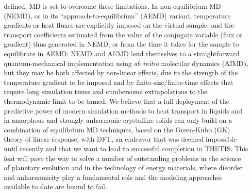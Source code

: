 defined.\cite{Allen1989} MD is set to overcome these limitations. In non-equilibrium MD (NEMD),\cite{Evans1990,Muller-Plathe1997} or in its ``approach-to-equilibrium'' (AEMD) variant,\cite{Lampin2013} temperature gradients or heat fluxes are explicitly imposed on the virtual sample, and the transport coefficients estimated from the value of the conjugate variable (flux or gradient) thus generated in NEMD, or from the time it takes for the sample to equilibrate in AEMD. NEMD and AEMD lend themselves to a straightforward  quantum-mechanical implementation \cite{Stackhouse2010b,Bouzid2017} using \emph{ab initio} molecular dynamics (AIMD),\cite{Car1985,Marx2009} but they may be both affected by non-linear effects, due to the strength of the temperature gradient to be imposed\cite{Schelling2002,He2012} and by finite-size/finite-time effects that require long simulation times and cumbersome extrapolations to the thermodynamic limit to be tamed.\cite{sellan2010,He2011,He2012,Zaoui2016,Wang2017} We believe that a full deployment of the predictive power of modern simulation methods to heat transport in liquids and in amorphous and strongly anharmonic crystalline solids can only build on a combination of equilibrium MD techniques, based on the Green-Kubo (GK) theory of linear response, with DFT, an endeavor that was deemed impossible until recently\cite{Marcolongo2016} and that we want to lead to successful completion in THETIS. This feat will pave the way to solve a number of outstanding problems in the science of planetary evolution and in the technology of energy materials, where disorder and anharmonicity play a fundamental role and the modeling approaches available to date are bound to fail.

